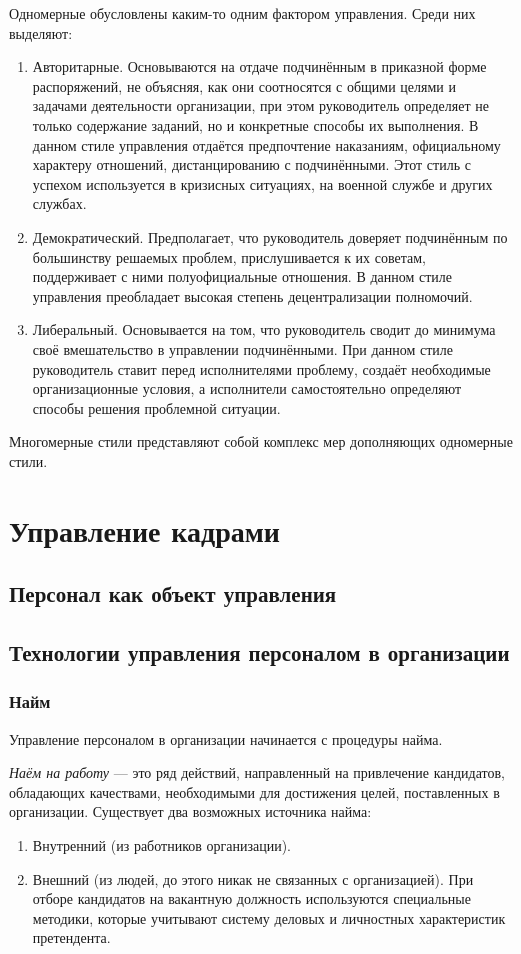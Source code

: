 \documentclass[12pt, russian, oneside, article]{ncc}
\begin{document}
Одномерные обусловлены каким-то одним фактором управления. Среди них выделяют:
\begin{enumerate}
\item Авторитарные. Основываются на отдаче подчинённым в приказной форме распоряжений, не объясняя, как они соотносятся с общими целями и задачами деятельности организации, при этом руководитель определяет не только содержание заданий, но и конкретные способы их выполнения. В данном стиле управления отдаётся предпочтение наказаниям, официальному характеру отношений, дистанцированию с подчинёнными. Этот стиль с успехом используется в кризисных ситуациях, на военной службе и других службах.
\item Демократический. Предполагает, что руководитель доверяет подчинённым по большинству решаемых проблем, прислушивается к их советам, поддерживает с ними полуофициальные отношения. В данном стиле управления преобладает высокая степень децентрализации полномочий.
\item Либеральный. Основывается на том, что руководитель сводит до минимума своё вмешательство в управлении подчинёнными. При данном стиле руководитель ставит перед исполнителями проблему, создаёт необходимые организационные условия, а исполнители самостоятельно определяют способы решения проблемной ситуации.
\end{enumerate}

Многомерные стили представляют собой комплекс мер дополняющих одномерные стили.
\section{Управление кадрами}
\label{sec-4}
\subsection{Персонал как объект управления}
\label{sec-4_1}
\subsection{Технологии управления персоналом в организации}
\label{sec-4_2}
\subsubsection{Найм}
\label{sec-4_2_1}


Управление персоналом в организации начинается с процедуры найма.

\emph{Наём на работу} --- это ряд действий, направленный на привлечение кандидатов, обладающих качествами, необходимыми для достижения целей, поставленных в организации. Существует два возможных источника найма:
\begin{enumerate}
\item Внутренний (из работников организации).
\item Внешний (из людей, до этого никак не связанных с организацией). При отборе кандидатов на вакантную должность используются специальные методики, которые учитывают систему деловых и личностных характеристик претендента.
\end{enumerate}
\end{document}

